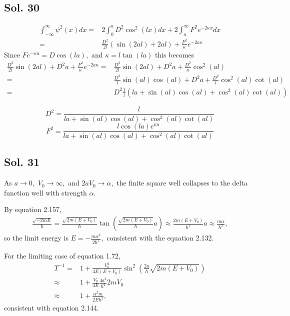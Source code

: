     \subsection*{Sol. 30}
    \begin{align*}
         \int_{-\infty}^{\infty}\psi^2(x)dx 
         = &  
        2\int_{0}^{a}D^2\cos^2(lx)dx + 
        2\int_{a}^{\infty}F^2e^{-2\kappa x}dx\\
        =& \frac{D^2}{2l}(\sin(2al) + 2al) + 
        \frac{F^2}{\kappa}e^{-2a\kappa}
    \end{align*}
    Since $Fe^{-\kappa a}=D\cos(la),$ and $\kappa = l\tan(la)$ this becomes
    \begin{align*}
        \frac{D^2}{2l}\sin(2al) + D^2a + 
        \frac{F^2}{\kappa}e^{-2a\kappa}
        =& \frac{D^2}{2l}\sin(2al) + D^2a + 
        \frac{D^2}{\kappa}\cos^2(al)\\
        =& 
        \frac{D^2}{l}\sin(al)\cos(al) + D^2a + 
        \frac{D^2}{l}\cos^2(al)\cot(al)\\
        =& D^2\frac{1}{l}(la + \sin(al)\cos(al)+\cos^2(al)\cot(al))
    \end{align*}

    $$
    D^2 = \frac{l}{la + \sin(al)\cos(al)+\cos^2(al)\cot(al)}
    $$
    $$
    F^2 = \frac{l\cos(la)e^{\kappa a}}{la + \sin(al)\cos(al)+\cos^2(al)\cot(al)}
    $$

    \subsection*{Sol. 31}
    As $a\to0,$ $V_0\to\infty,$ and $2aV_0\to\alpha,$
    the finite square well collapses to the delta function well with strength $\alpha$.

    By equation 2.157, 
    \begin{align*}
        \frac{\sqrt{-2mE}}{\hbar} = 
        \frac{\sqrt{2m(E+V_0)}}{\hbar}
        \tan(\frac{\sqrt{2m(E+V_0)}}{\hbar}a)
        \approx 
        \frac{2m(E+V_0)}{\hbar^2}a
        \approx\frac{m\alpha}{\hbar^2},
    \end{align*}
    so the limit energy is $E=-\frac{m\alpha^2}{2\hbar^2},$ consistent with the equation 2.132.

    For the limiting case of equation 1.72,
    \begin{align*}
        T^{-1}=&
        1+\frac{V_0^2}{4E(E+V_0)}\sin^2(\frac{2a}{\hbar}\sqrt{2m(E+V_0)})\\
        \approx&1+\frac{V_0}{4E}
        \frac{4a^2}{\hbar^2}2mV_0\\
        \approx &
        1+\frac{\alpha^2m}{2E\hbar^2},
    \end{align*}
    consistent with equation 2.144.

